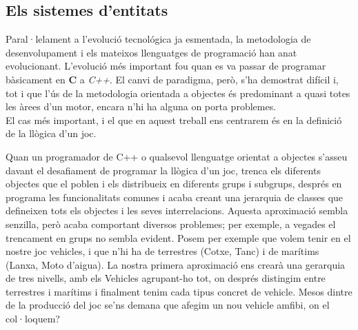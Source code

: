 \subsection{Els sistemes d'entitats}

Paral·lelament a l'evolució tecnológica ja esmentada, la metodologia de desenvolupament i els mateixos llenguatges de programació han anat evolucionant. L'evolució més important fou quan es va passar de programar bàsicament en {\bf C} a {\em C++}. El canvi de paradigma, però, s'ha demostrat difícil i, tot i que l'ús de la metodologia orientada a objectes és predominant a quasi totes les àrees d'un motor, encara n'hi ha alguna on porta problemes.
\\

El cas més important, i el que en aquest treball ens centrarem és en la definició de la llògica d'un joc.

Quan un programador de {C++} o qualsevol llenguatge orientat a objectes s'asseu davant el desafiament de programar la llògica d'un joc, trenca els diferents objectes que el poblen i els distribueix en diferents grups i subgrups, després en programa les funcionalitats comunes i acaba creant una jerarquia de classes que defineixen tots els objectes i les seves interrelacions. 
Aquesta aproximació sembla senzilla, però acaba comportant diversos problemes; per exemple, a vegades el trencament en grups no sembla evident. Posem per exemple que volem tenir en el nostre joc vehicles, i que n'hi ha de terrestres (Cotxe, Tanc) i de marítims (Lanxa, Moto d'aigua). La nostra primera aproximació ens crearà una gerarquia de tres nivells, amb els Vehicles agrupant-ho tot, on després distingim entre terrestres i marítims i finalment tenim cada tipus concret de vehicle. Mesos dintre de la producció del joc se'ns demana que afegim un nou vehicle amfibi, on el col·loquem? \citep{Gregory09} \citep{Leonard99}

